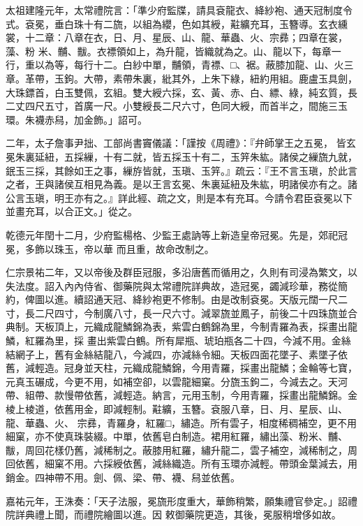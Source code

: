 \begin{pinyinscope}
 太祖建隆元年，太常禮院言：「準少府監牒，請具袞龍衣、絳紗袍、通天冠制度令式。袞冕，垂白珠十有二旒，以組為纓，色如其綬，黈纊充耳，玉簪導。玄衣纁裳，十二章：八章在衣，日、月、星辰、山、龍、華蟲、火、宗彞；四章在裳，藻、粉
 米、黼、黻。衣褾領如上，為升龍，皆織就為之。山、龍以下，每章一行，重以為等，每行十二。白紗中單，黼領，青褾、□、裾。蔽膝加龍、山、火三章。革帶，玉鉤。大帶，素帶朱裏，紕其外，上朱下綠，紐約用組。鹿盧玉具劍，大珠鏢首，白玉雙佩，玄組。雙大綬六採，玄、黃、赤、白、縹、綠，純玄質，長二丈四尺五寸，首廣一尺。小雙綬長二尺六寸，色同大綬，而首半之，間施三玉環。朱襪赤舄，加金飾。」詔可。



 二年，太子詹事尹拙、工部尚書竇儀議：「謹按《周禮》：『弁師掌王之五冕，
 皆玄冕朱裏延紐，五採繅，十有二就，皆五採玉十有二，玉笄朱紘。諸侯之繅旒九就，鈱玉三採，其餘如王之事，繅斿皆就，玉瑱、玉笄。』疏云：『王不言玉瑱，於此言之者，王與諸侯互相見為義。是以王言玄冕、朱裏延紐及朱紘，明諸侯亦有之。諸公言玉瑱，明王亦有之。』詳此經、疏之文，則是本有充耳。今請令君臣袞冕以下並畫充耳，以合正文。」從之。



 乾德元年閏十二月，少府監楊格、少監王處訥等上新造皇帝冠冕。先是，郊祀冠冕，多飾以珠玉，帝以華
 而且重，故命改制之。



 仁宗景祐二年，又以帝後及群臣冠服，多沿唐舊而循用之，久則有司浸為繁文，以失法度。詔入內內侍省、御藥院與太常禮院詳典故，造冠冕，蠲減珍華，務從簡約，俾圖以進。續詔通天冠、絳紗袍更不修制。由是改制袞冕。天版元闊一尺二寸，長二尺四寸，今制廣八寸，長一尺六寸。減翠旒並鳳子，前後二十四珠旒並合典制。天板頂上，元織成龍鱗錦為表，紫雲白鶴錦為里，今制青羅為表，採畫出龍鱗，紅羅為里，採
 畫出紫雲白鶴。所有犀瓶、琥珀瓶各二十四，今減不用。金絲結網子上，舊有金絲結龍八，今減四，亦減絲令細。天板四面花墜子、素墜子依舊，減輕造。冠身並天柱，元織成龍鱗錦，今用青羅，採畫出龍鱗；金輪等七寶，元真玉碾成，今更不用，如補空卻，以雲龍細窠。分旒玉鉤二，今減去之。天河帶、組帶、款慢帶依舊，減輕造。納言，元用玉制，今用青羅，採畫出龍鱗錦。金棱上棱道，依舊用金，即減輕制。黈纊，玉簪。袞服八章，日、月、星辰、山、龍、華蟲、火、
 宗彞，青羅身，紅羅□，繡造。所有雲子，相度稀稠補空，更不用細窠，亦不使真珠裝綴。中單，依舊皂白制造。裙用紅羅，繡出藻、粉米、黼、黻，周回花樣仍舊，減稀制之。蔽膝用紅羅，繡升龍二，雲子補空，減稀制之，周回依舊，細窠不用。六採綬依舊，減絲織造。所有玉環亦減輕。帶頭金葉減去，用銷金。四神帶不用。劍、佩、梁、帶、襪、舄並依舊。



 嘉祐元年，王洙奏：「天子法服，冕旒形度重大，華飾稍繁，願集禮官參定。」詔禮院詳典禮上聞，而禮院繪圖以進。因
 敕御藥院更造，其後，冕服稍增侈如故。




\end{pinyinscope}
